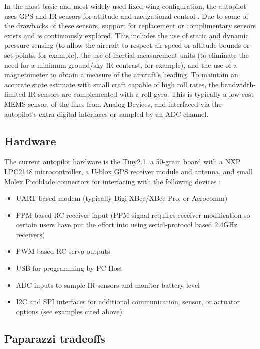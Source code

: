 \documentclass[a4paper,11pt]{report}
\begin{document}
In the most basic and most widely used fixed-wing configuration, the autopilot uses GPS and IR sensors for attitude and navigational control \cite{paparazzi_paper}. Due to some of the drawbacks of these sensors, support for replacement or complimentary sensors exists and is continuously explored. This includes the use of static and dynamic pressure sensing (to allow the aircraft to respect air-speed or altitude bounds or set-points, for example), the use of inertial measurement units (to eliminate the need for a minimum ground/sky IR contrast, for example), and the use of a magnetometer to obtain a measure of the aircraft's heading. To maintain an accurate state estimate with small craft capable of high roll rates, the bandwidth-limited IR sensors are complemented with a roll gyro. This is typically a low-cost MEMS sensor, of the likes from Analog Devices, and interfaced via the autopilot's extra digital interfaces or sampled by an ADC channel.

\subsection{Hardware}

The current autopilot hardware is the Tiny2.1, a 50-gram board with a NXP LPC2148 microcontroller, a U-blox GPS receiver module and antenna, and small Molex Picoblade connectors for interfacing with the following devices :

\begin{itemize}
\item UART-based modem (typically Digi XBee/XBee Pro, or Aerocomm)
\item PPM-based RC receiver input (PPM signal requires receiver modification so certain users have put the effort into using serial-protocol based 2.4GHz receivers)
\item PWM-based RC servo outputs
\item USB for programming by PC Host
\item ADC inputs to sample IR sensors and monitor battery level
\item I2C and SPI interfaces for additional communication, sensor, or actuator options (see examples cited above)
\end{itemize}

\subsection{Paparazzi tradeoffs}
\end{document}

